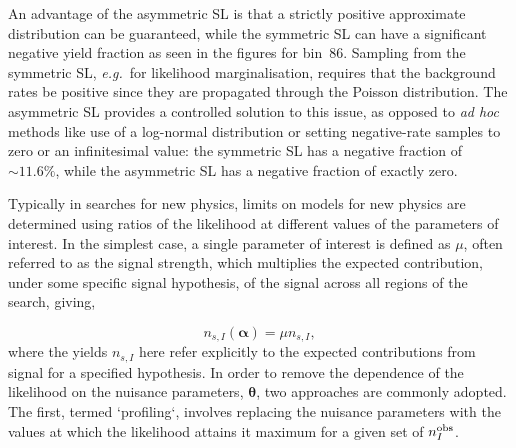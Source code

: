 \documentclass[11pt]{article}
\def\eg{{\it e.g.}}
\begin{document}

An advantage of the asymmetric SL is that a strictly positive
approximate distribution can be guaranteed, while the symmetric SL can have a
significant negative yield fraction as seen in the figures for bin~86. Sampling
from the symmetric SL, \eg\ for likelihood marginalisation, requires that the
background rates be positive since they are propagated through the Poisson
distribution. The asymmetric SL provides a controlled solution to this issue,
as opposed to \emph{ad hoc} methods like use of a log-normal distribution or
setting negative-rate samples to zero or an infinitesimal value: the symmetric SL has a negative fraction of $\sim\!11.6\%$, while the
asymmetric SL has a negative fraction of exactly zero.

Typically in searches for new physics, limits on models for new physics
are determined using ratios of the likelihood at different values of the parameters of interest.
In the simplest case, a single parameter of interest is defined as $\mu$, often referred to
as the signal strength, which multiplies the expected contribution, under some specific signal hypothesis,
of the signal across all regions of the search, giving,

\begin{equation}
 n_{s,I}(\bm{\alpha}) = \mu n_{s,I},
\label{eq:muscale}
\end{equation}
where the yields $n_{s,I}$ here refer explicitly to the expected contributions from signal for a specified hypothesis.
In order to remove the dependence of the likelihood on the nuisance parameters, $\bm{\theta}$, two approaches are
commonly adopted. The first, termed `profiling`, involves replacing the nuisance parameters with the values at which
the likelihood attains it maximum for a given set of $n^{\rm{obs}}_{I}$.
\end{document}
